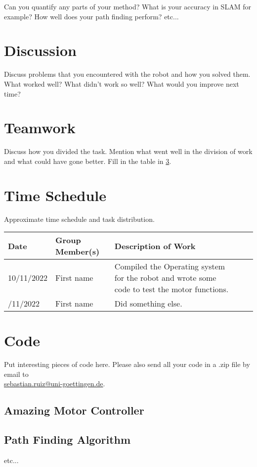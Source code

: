 \documentclass[
	12pt,
]{sty/report_style}
\begin{document}
Can you quantify any parts of your method? What is your accuracy in SLAM for example? How well does your path finding perform? etc...

\section{Discussion}

Discuss problems that you encountered with the robot and how you solved them. What worked well? What didn't work so well? What would you improve next time? 

\section{Teamwork}

Discuss how you divided the task. Mention what went well in the division of work and what could have gone better. Fill in the table in \cref{appendix:time_schedule}.

\clearpage
\appendix
\section{Time Schedule}\label{appendix:time_schedule}

Approximate time schedule and task distribution.

\begin{table}[h]
\begin{tabularx}{\linewidth}{@{}p{2cm}p{4cm}Xc>{\centering\arraybackslash}c@{}}
\toprule
Date                  & Group Member(s)        & Description of Work \\
\midrule
10/11/2022 & First name & Compiled the Operating system for the robot and wrote some code to test the motor functions. \\
\addlinespace[0.5em]
10/11/2022 & First name & Did something else. \\
\bottomrule
\end{tabularx}
\end{table}



\clearpage
\section{Code}\label{appendix:code}

Put interesting pieces of code here. Please also send all your code in a .zip file by email to \\ \href{mailto:sebastian.ruiz@uni-goettingen.de}{sebastian.ruiz@uni-goettingen.de}. 

\subsection*{Amazing Motor Controller}

\subsection*{Path Finding Algorithm}

etc...
\end{document}
